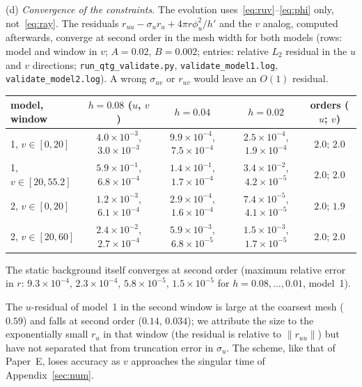 \documentclass[11pt]{article}
\begin{document}
(d) \emph{Convergence of the constraints.} The evolution uses~\eqref{eq:ruv}--\eqref{eq:phi} only, not~\eqref{eq:ray}. The residuals $r_{uu}-\sigma_ur_u+4\pi r\phi_u^{2}/h'$ and the $v$ analog, computed afterwards, converge at second order in the mesh width for both models (rows: model and window in $v$; $A=0.02$, $B=0.002$; entries: relative $L_2$ residual in the $u$ and $v$ directions; \texttt{run\_qtg\_validate.py}, \texttt{validate\_model1.log}, \texttt{validate\_model2.log}). A wrong $\sigma_{uv}$ or $r_{uv}$ would leave an $O(1)$ residual.

\begin{center}\small
\begin{tabular}{lcccc}
\toprule
model, window & $h=0.08$ ($u$, $v$) & $h=0.04$ & $h=0.02$ & orders ($u$; $v$)\\\midrule
1, $v\in[0,20]$ & $4.0\!\times\!10^{-3}$, $3.0\!\times\!10^{-3}$ & $9.9\!\times\!10^{-4}$, $7.5\!\times\!10^{-4}$ & $2.5\!\times\!10^{-4}$, $1.9\!\times\!10^{-4}$ & $2.0$; $2.0$\\
1, $v\in[20,55.2]$ & $5.9\!\times\!10^{-1}$, $6.8\!\times\!10^{-4}$ & $1.4\!\times\!10^{-1}$, $1.7\!\times\!10^{-4}$ & $3.4\!\times\!10^{-2}$, $4.2\!\times\!10^{-5}$ & $2.0$; $2.0$\\
2, $v\in[0,20]$ & $1.2\!\times\!10^{-3}$, $6.1\!\times\!10^{-4}$ & $2.9\!\times\!10^{-4}$, $1.6\!\times\!10^{-4}$ & $7.4\!\times\!10^{-5}$, $4.1\!\times\!10^{-5}$ & $2.0$; $1.9$\\
2, $v\in[20,60]$ & $2.4\!\times\!10^{-2}$, $2.7\!\times\!10^{-4}$ & $5.9\!\times\!10^{-3}$, $6.8\!\times\!10^{-5}$ & $1.5\!\times\!10^{-3}$, $1.7\!\times\!10^{-5}$ & $2.0$; $2.0$\\\bottomrule
\end{tabular}
\end{center}
The static background itself converges at second order (maximum relative error in $r$: $9.3\times10^{-4},\,2.3\times10^{-4},\,5.8\times10^{-5},\,1.5\times10^{-5}$ for $h=0.08,\ldots,0.01$, model~1).

The $u$-residual of model~1 in the second window is large at the coarsest mesh ($0.59$) and falls at second order ($0.14$, $0.034$); we attribute the size to the exponentially small $r_u$ in that window (the residual is relative to $\|r_{uu}\|$) but have not separated that from truncation error in $\sigma_u$. The scheme, like that of Paper~E, loses accuracy as $v$ approaches the singular time of Appendix~\ref{sec:num}.
\end{document}

